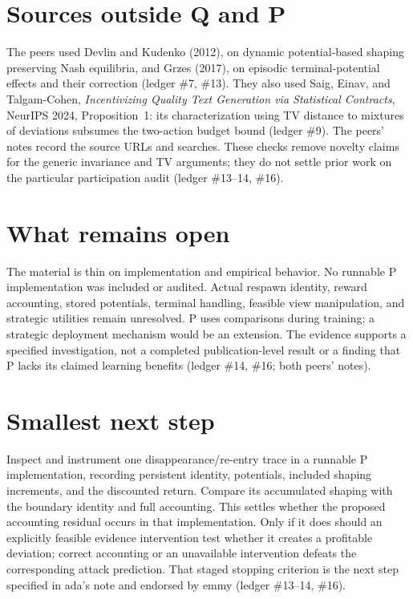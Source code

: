\documentclass{article}
\begin{document}
\section*{Sources outside Q and P}
The peers used Devlin and Kudenko (2012), on dynamic potential-based shaping preserving Nash equilibria, and
Grzes (2017), on episodic terminal-potential effects and their correction (ledger \#7, \#13). They also used
Saig, Einav, and Talgam-Cohen, \emph{Incentivizing Quality Text Generation via Statistical Contracts}, NeurIPS
2024, Proposition~1: its characterization using TV distance to mixtures of deviations subsumes the two-action
budget bound (ledger \#9). The peers' notes record the source URLs and searches. These checks remove novelty
claims for the generic invariance and TV arguments; they do not settle prior work on the particular
participation audit (ledger \#13--14, \#16).

\section*{What remains open}
The material is thin on implementation and empirical behavior. No runnable P implementation was included or
audited. Actual respawn identity, reward accounting, stored potentials, terminal handling, feasible view
manipulation, and strategic utilities remain unresolved. P uses comparisons during training; a strategic
deployment mechanism would be an extension. The evidence supports a specified investigation, not a completed
publication-level result or a finding that P lacks its claimed learning benefits (ledger \#14, \#16; both
peers' notes).

\section*{Smallest next step}
Inspect and instrument one disappearance/re-entry trace in a runnable P implementation, recording persistent
identity, potentials, included shaping increments, and the discounted return. Compare its accumulated shaping
with the boundary identity and full accounting. This settles whether the proposed accounting residual occurs
in that implementation. Only if it does should an explicitly feasible evidence intervention test whether it
creates a profitable deviation; correct accounting or an unavailable intervention defeats the corresponding
attack prediction. That staged stopping criterion is the next step specified in ada's note and endorsed by
emmy (ledger \#13--14, \#16).
\end{document}
